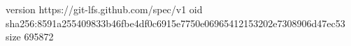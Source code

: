 version https://git-lfs.github.com/spec/v1
oid sha256:8591a255409833b46fbe4df0c6915e7750e06965412153202e7308906d47ec53
size 695872
